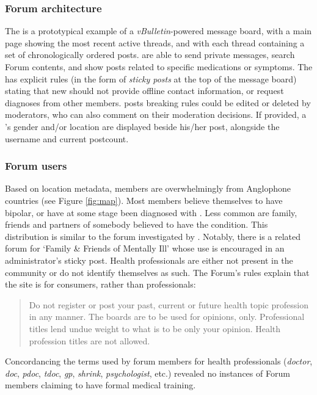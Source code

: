 \subsubsection{Forum architecture}

The  is a prototypical example of a \emph{vBulletin}-powered message board, with a main page showing the most recent active \glspl{thread}, and with each \gls{thread} containing a set of chronologically ordered \glspl{post}.  are able to send private messages, search \gls{Forum} contents, and show \glspl{post} related to specific medications or symptoms. The  has explicit rules (in the form of \emph{sticky \glspl{post}} at the top of the message board) stating that new  should not provide offline contact information, or request diagnoses from other \glspl{member}. \Glspl{post} breaking rules could be edited or deleted by moderators, who can also comment on their moderation decisions. If provided, a 's gender and\slash or location are displayed beside his\slash her \gls{post}, alongside the username and current postcount.

\subsubsection{Forum users}

Based on location metadata, \glspl{member} are overwhelmingly from Anglophone countries (see Figure \ref{fig:map}). Most members believe themselves to have \gls{bipolar}, or have at some stage been diagnosed with . Less common are family, friends and partners of somebody believed to have the condition. This distribution is similar to the \gls{forum} investigated by \textcite{vayreda_social_2009}. Notably, there is a related \gls{forum} for `Family \& Friends of Mentally Ill' whose use is encouraged in an administrator's sticky \gls{post}. Health professionals are either not present in the community or do not identify themselves as such. The \gls{Forum}'s rules explain that the site is for \glspl{consumer}, rather than professionals:

\begin{quote} \singlespacing \small
Do not register or \gls{post} your past, current or future health topic profession in any manner. The boards are to be used for  opinions, only. Professional titles lend undue weight to what is to be only your opinion. Health profession titles are not allowed. %
\end{quote}
%
Concordancing the terms used by forum \glspl{member} for health professionals (\emph{doctor}, \emph{doc}, \emph{pdoc}, \emph{tdoc}, \emph{gp}, \emph{shrink}, \emph{psychologist}, etc.) revealed no instances of \gls{Forum} \glspl{member} claiming to have formal medical training.

